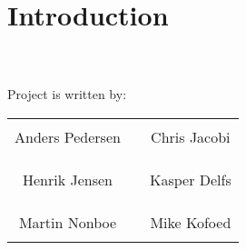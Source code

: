\chapter*{Introduction}

 \\\\


Project is written by:\\
%
\phantom{Luft}\vspace{3cm}
\begin{table}[H]
	\centering
		\begin{tabular}{c c c}
			\underline{\phantom{JAERJAERJAERJAERGO}} & \phantom{cookies} & \underline{\phantom{JAERJAERJAERJAERGO}} \\
			Anders Pedersen			& \phantom{cookies} & Chris Jacobi		\\
			&&\\
			&&\\
			\underline{\phantom{JAERJAERJAERJAERGO}} & \phantom{cookies} & \underline{\phantom{JAERJAERJAERJAERGO}} \\
			Henrik Jensen			& \phantom{cookies} & Kasper Delfs		\\
			&&\\
			&&\\
	    \underline{\phantom{JAERJAERJAERJAERGO}} & \phantom{cookies} & \underline{\phantom{JAERJAERJAERJAERGO}} \\
			Martin Nonboe 					& \phantom{cookies} & Mike Kofoed 			\\			
			&&\\							
		\end{tabular}
\end{table}